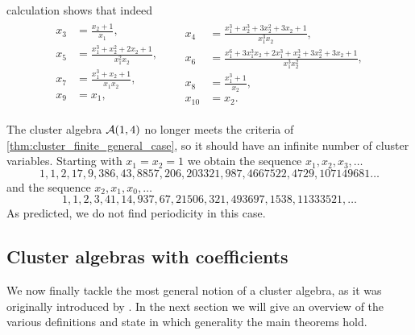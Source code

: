 \begin{example}
	calculation shows that indeed
	\begin{align*}
		\begin{aligned}
			x_{3} & =\frac{x_{2} + 1}{x_{1}},                                     \\
			x_{5} & =\frac{x_{1}^{3} + x_{2}^{2} + 2 x_{2} + 1}{x_{1}^{2} x_{2}}, \\
			x_{7} & =\frac{x_{1}^{3} + x_{2} + 1}{x_{1} x_{2}},                   \\
			x_{9} & =x_{1},                                                       \\
		\end{aligned}
		 &  &
		\begin{aligned}
			x_{4}  & =\frac{x_{1}^{3} + x_{2}^{3} + 3 x_{2}^{2} + 3 x_{2} + 1}{x_{1}^{3} x_{2}},                                       \\
			x_{6}  & =\frac{x_{1}^{6} + 3 x_{1}^{3} x_{2} + 2 x_{1}^{3} + x_{2}^{3} + 3 x_{2}^{2} + 3 x_{2} + 1}{x_{1}^{3} x_{2}^{2}}, \\
			x_{8}  & =\frac{x_{1}^{3} + 1}{x_{2}},                                                                                     \\
			x_{10} & =x_{2}.
		\end{aligned}
	\end{align*}

	The cluster algebra $\mathcal{A}(1,4)$ no longer meets the criteria of
	\cref{thm:cluster_finite_general_case}, so it should have an infinite number of cluster
	variables. Starting with $x_1 = x_2 = 1$ we obtain the sequence $x_1, x_2, x_3, \dots$
	\begin{equation*}
		1,1,2,17,9,386,43,8857,206,203321,987,4667522,4729,107149681\dots
	\end{equation*}
	and the sequence $x_2, x_1, x_0, \dots$
	\begin{equation*}
		1,1,2,3,41,14,937,67,21506,321,493697,1538,11333521,\dots
	\end{equation*}
	As predicted, we do not find periodicity in this case.
\end{example}

\subsection{Cluster algebras with coefficients}\label{sec:cluster_algebras_coefficients}

We now finally tackle the most general notion of a cluster algebra, as it was
originally introduced by \textcite{FominZelevinsky2002CAF}. In the next section we will
give an overview of the various definitions and state in which generality the main
theorems hold.

